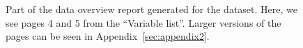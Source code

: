 \documentclass[article,shortnames]{jss}
\begin{document}
\begin{figure}[tb]
\begin{center}
\end{center}
\caption{Part of the data overview report generated for the  dataset. Here, we see pages 4 and 5 from the ``Variable list''. Larger versions of the pages can be seen in
  Appendix~\ref{sec:appendix2}.}
\label{fig:bigExampleP45}
\end{figure}
\end{document}
